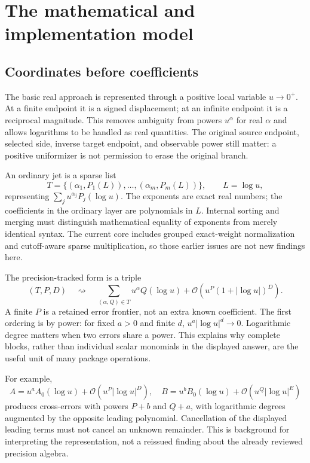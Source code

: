 \documentclass[11pt,letterpaper]{article}
\newcommand{\OO}{\mathcal O}
\begin{document}
\section{The mathematical and implementation model}

\subsection{Coordinates before coefficients}

The basic real approach is represented through a positive local variable $u\to0^+$. At a finite endpoint it is a signed displacement; at an infinite endpoint it is a reciprocal magnitude. This removes ambiguity from powers $u^\alpha$ for real $\alpha$ and allows logarithms to be handled as real quantities. The original source endpoint, selected side, inverse target endpoint, and observable power still matter: a positive uniformizer is not permission to erase the original branch.~\cite{core,lambert,corepert}

An ordinary jet is a sparse list
\[
 T=\{(\alpha_1,P_1(L)),\ldots,(\alpha_m,P_m(L))\},\qquad L=\log u,
\]
representing $\sum_j u^{\alpha_j}P_j(\log u)$. The exponents are exact real numbers; the coefficients in the ordinary layer are polynomials in $L$. Internal sorting and merging must distinguish mathematical equality of exponents from merely identical syntax. The current core includes grouped exact-weight normalization and cutoff-aware sparse multiplication, so those earlier issues are not new findings here.~\cite{core,register}

The precision-tracked form is a triple
\[
 (T,P,D)\quad\rightsquigarrow\quad
 \sum_{(\alpha,Q)\in T}u^\alpha Q(\log u)
 +\OO\!\left(u^P(1+|\log u|)^D\right).
\]
A finite $P$ is a retained error frontier, not an extra known coefficient. The first ordering is by power: for fixed $a>0$ and finite $d$, $u^a|\log u|^d\to0$. Logarithmic degree matters when two errors share a power. This explains why complete blocks, rather than individual scalar monomials in the displayed answer, are the useful unit of many package operations.

For example,
\[
 A=u^a A_0(\log u)+\OO(u^P|\log u|^D),\quad
 B=u^b B_0(\log u)+\OO(u^Q|\log u|^E)
\]
produces cross-errors with powers $P+b$ and $Q+a$, with logarithmic degrees augmented by the opposite leading polynomial. Cancellation of the displayed leading terms must not cancel an unknown remainder. This is background for interpreting the representation, not a reissued finding about the already reviewed precision algebra.
\end{document}
